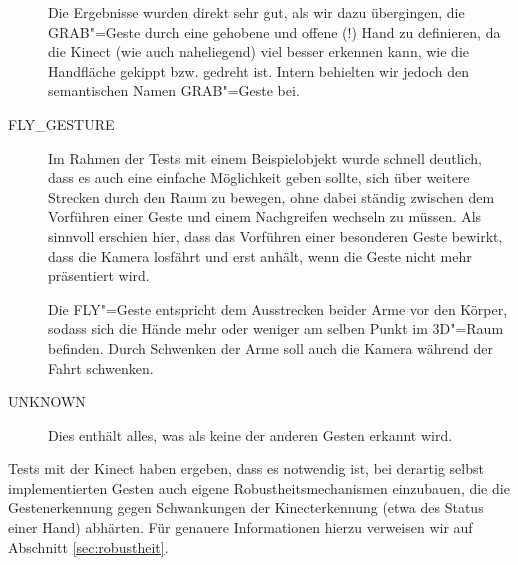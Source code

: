 \begin{description}
		Die Ergebnisse wurden direkt sehr gut, als wir dazu übergingen, die GRAB"=Geste durch eine gehobene und offene (!) Hand zu definieren, da die Kinect (wie auch naheliegend) viel besser erkennen kann, wie die Handfläche gekippt bzw. gedreht ist. Intern behielten wir jedoch den semantischen Namen \glqq GRAB\grqq"=Geste bei.
		\item[FLY\_GESTURE] Im Rahmen der Tests mit einem Beispielobjekt wurde schnell deutlich, dass es auch eine einfache Möglichkeit geben sollte, sich über weitere Strecken durch den Raum zu bewegen, ohne dabei ständig zwischen dem Vorführen einer Geste und einem \glqq Nachgreifen\grqq{} wechseln zu müssen. Als sinnvoll erschien hier, dass das Vorführen einer besonderen Geste bewirkt, dass die Kamera losfährt und erst anhält, wenn die Geste nicht mehr präsentiert wird.\par 
		Die FLY"=Geste entspricht dem Ausstrecken beider Arme vor den Körper, sodass sich die Hände mehr oder weniger am selben Punkt im 3D"=Raum befinden. Durch Schwenken der Arme soll auch die Kamera während der Fahrt schwenken.
		\item[UNKNOWN] Dies enthält alles, was als keine der anderen Gesten erkannt wird.
	\end{description}
	Tests mit der Kinect haben ergeben, dass es notwendig ist, bei derartig selbst implementierten Gesten auch eigene Robustheitsmechanismen einzubauen, die die Gestenerkennung gegen Schwankungen der Kinecterkennung (etwa des Status einer Hand) abhärten. Für genauere Informationen hierzu verweisen wir auf Abschnitt \ref{sec:robustheit}.